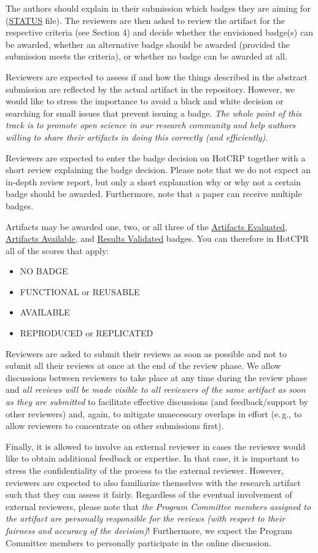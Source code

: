 \documentclass[twoside,a4paper]{refart}
\newcommand{\eg}{e.\,g.,\xspace}
\newcommand{\evaluated}{\protect\hyperlink{evaluated}{Artifacts Evaluated}\xspace}
\newcommand{\available}{\protect\hyperlink{available}{Artifacts Available}\xspace}
\newcommand{\validated}{\protect\hyperlink{validated}{Results Validated}\xspace}
\begin{document}
The authors should explain in their submission which badges they are
aiming for (\hyperlink{status}{STATUS} file). The reviewers are
then asked to review the artifact for the respective criteria (see
Section 4) and decide whether the envisioned badge(s) can be awarded,
whether an alternative badge should be awarded (provided the
submission meets the criteria), or whether no badge can be awarded at
all.

Reviewers are expected to assess if and how the things described in
the abstract submission are reflected by the actual artifact in the
repository. However, we would like to stress the importance to avoid a
black and white decision or searching for small issues that prevent
issuing a badge. \emph{The whole point of this track is to promote open
science in our research community and help authors willing to share
their artifacts in doing this correctly (and efficiently)}.

Reviewers are expected to enter the badge decision on HotCRP together
with a short review explaining the badge decision. Please note that we
do not expect an in-depth review report, but only a short explanation
why or why not a certain badge should be awarded. Furthermore, note
that a paper can receive multiple badges.

Artifacts may be awarded one, two, or all three of the \evaluated,
\available, and \validated badges. You can therefore in HotCPR all of
the scores that apply:

\begin{itemize}
\item NO BADGE
\item FUNCTIONAL or REUSABLE
\item AVAILABLE
\item REPRODUCED or  REPLICATED
\end{itemize}

\attention Reviewers are asked to submit their reviews as soon as
possible and not to submit all their reviews at once at the end of the
review phase. We allow discussions between reviewers to take place at
any time during the review phase and \emph{all reviews will be made
  visible to all reviewers of the same artifact as soon as they are
  submitted} to facilitate effective discussions (and feedback/support
by other reviewers) and, again, to mitigate unnecessary overlaps in
effort (\eg to allow reviewers to concentrate on other submissions
first).

Finally, it is allowed to involve an external reviewer in cases the
reviewer would like to obtain additional feedback or expertise. In
that case, it is important to stress the confidentiality of the
process to the external reviewer. However, reviewers are expected to
also familiarize themselves with the research artifact such that they
can assess it fairly. Regardless of the eventual involvement of
external reviewers, please note that \emph{the Program Committee
  members assigned to the artifact are personally responsible for the
  reviews (with respect to their fairness and accuracy of the
  decision)}! Furthermore, we expect the Program Committee members to
personally participate in the online discussion.
\end{document}
